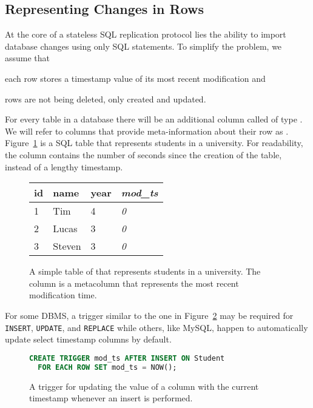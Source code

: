 \subsection{Representing Changes in Rows}  \label{sec:changes}

At the core of a stateless SQL replication protocol lies the ability to import
database changes using only SQL statements. To simplify the problem, we assume that
\begin{inparaenum}
\item each row stores a timestamp value of its most recent modification and
\item rows are not being deleted, only created and updated.
\end{inparaenum}
For every table in a database there will be an additional column called
\modts of type . We will refer to columns that provide
meta-information about their row as .
Figure~\ref{fig:student_init} is a SQL table that represents students in a
university. For readability, the \modts column contains the number of seconds
since the creation of the table, instead of a lengthy timestamp.

\begin{figure}[h!]
\center
\begin{tabular}{ l  l  l  l }
id  & name      & year  & \textit{mod\_ts} \\
\hline
1   & Tim   & 4     & \textit{0}        \\
2   & Lucas     & 3     & \textit{0}        \\
3   & Steven    & 3     & \textit{0}        \\
\end{tabular}
\caption{A simple table of that represents students in a university. The \modts
column is a metacolumn that represents the most recent modification time.}
\label{fig:student_init}
\end{figure}

For some DBMS, a trigger similar to the one in Figure~\ref{fig:student_trigger}
may be required for \texttt{INSERT}, \texttt{UPDATE}, and \texttt{REPLACE} while
others, like MySQL, happen to automatically update select timestamp columns by
default\cite{_mysql_????-2}.

\begin{figure}[h!]
\begin{lstlisting}[language=sql]
CREATE TRIGGER mod_ts AFTER INSERT ON Student
  FOR EACH ROW SET mod_ts = NOW();
\end{lstlisting}
\caption{A trigger for updating the value of a \modts column with the current
timestamp whenever an insert is performed.}
\label{fig:student_trigger}
\end{figure}

